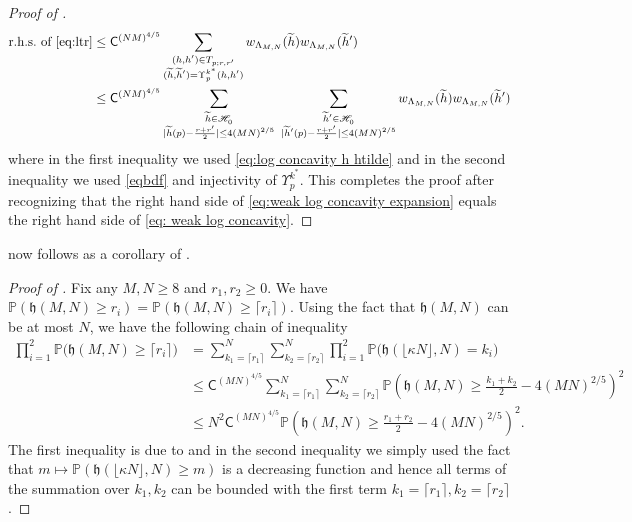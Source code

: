 \documentclass[reqno,11pt]{amsart}
\newcommand{\h}{\mathfrak{h}}
\renewcommand{\Pr}{\mathbb{P}}
\numberwithin{equation}{section}
\theoremstyle{definition}
\begin{document}
\begin{proof}[Proof of ]
    \begin{equation} \label{eq:weak log concavity expansion}
    \begin{split}
       \mbox{r.h.s.~of \eqref{eq:ltr}} & \le 
        \mathsf{C}^{(NM)^{4/5}} \sum_{ \substack{ (h,h')\in T_{p;r,r'} \\ (\widetilde{h},\widetilde{h}') =\Upsilon_p^{k^*}(h,h')} }  w_{\Lambda_{M,N}}(\widetilde{h}) w_{\Lambda_{M,N}} (\widetilde{h}')  \\ & \le 
\mathsf{C}^{(NM)^{4/5}}\sum_{\substack{\widetilde{h} \in \mathscr{H}_0^{} \\ |\widetilde{h}(p)-\frac{r+r'}2|\le 4(MN)^{2/5}}} \,\, \sum_{\substack{\widetilde{h}'\in \mathscr{H}_0^{} \\ |\widetilde{h}'(p)-\frac{r+r'}2|\le 4(MN)^{2/5}}}  w_{\Lambda_{M,N}}(\widetilde{h}) w_{\Lambda_{M,N}} (\widetilde{h}')
    \end{split}
    \end{equation}
    where in the first inequality we used \eqref{eq:log concavity h htilde} and in the second inequality we used \eqref{eqbdf} and injectivity of $\Upsilon_p^{k^*}$. This completes the proof after recognizing that the right hand side of \eqref{eq:weak log concavity expansion} equals the right hand side of \eqref{eq: weak log concavity}.
\end{proof}

   now follows as a  corollary of . 
\begin{proof}[Proof of ]   Fix any $M,N \ge 8$ and $r_1, r_2\ge0$. We have $\Pr(\h(M,N)\ge r_i)=\Pr(\h(M,N)\ge \lceil r_i \rceil)$. Using the fact that $\h(M,N)$ can be at most $N$, we have the following chain of inequality
    \begin{equation*}
    \begin{split}
        \prod_{i=1}^2\Pr\big(\h(M,N) \ge  \lceil r_i \rceil \big) &= 
        \sum_{k_1 = \lceil r_1 \rceil}^N \sum_{k_2 = \lceil r_2 \rceil}^N \prod_{i=1}^2\Pr\big(\h(\lfloor \kappa N \rfloor,N) =  k_i \big)
        \\
        & \le \mathsf{C}^{(MN)^{4/5}} \sum_{k_1 = \lceil r_1 \rceil}^N \sum_{k_2 = \lceil r_2 \rceil}^N  \mathbb{P} \left(   \h(M,N)  \ge  \frac{k_1+k_2}{2} - 4(MN)^{2/5} \right)^2
        \\
        & \le N^2\mathsf{C}^{(MN)^{4/5}} \mathbb{P} \left(   \h(M,N)  \ge  \frac{r_1+r_2}{2} - 4(MN)^{2/5} \right)^2.
    \end{split}
    \end{equation*}
   The first inequality is due to  and in the second inequality we simply used the fact that $m\mapsto \mathbb{P} \left(   \h(\lfloor \kappa N \rfloor,N)  \ge m \right)$ is a  decreasing function and hence all terms of the summation over $k_1,k_2$ can be bounded with the first term $k_1=\lceil r_1 \rceil, k_2=\lceil r_2 \rceil$.
\end{proof}
\end{document}
